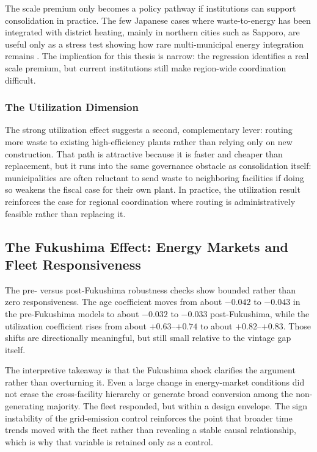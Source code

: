 \documentclass[12pt,a4paper]{article}
\begin{document}
The scale premium only becomes a policy pathway if institutions can support consolidation in practice. The few Japanese cases where waste-to-energy has been integrated with district heating, mainly in northern cities such as Sapporo, are useful only as a stress test showing how rare multi-municipal energy integration remains \citep{TabataTsai2016}. The implication for this thesis is narrow: the regression identifies a real scale premium, but current institutions still make region-wide coordination difficult.

\subsubsection{The Utilization Dimension}

The strong utilization effect suggests a second, complementary lever: routing more waste to existing high-efficiency plants rather than relying only on new construction. That path is attractive because it is faster and cheaper than replacement, but it runs into the same governance obstacle as consolidation itself: municipalities are often reluctant to send waste to neighboring facilities if doing so weakens the fiscal case for their own plant. In practice, the utilization result reinforces the case for regional coordination where routing is administratively feasible rather than replacing it.

\subsection{The Fukushima Effect: Energy Markets and Fleet Responsiveness}

The pre- versus post-Fukushima robustness checks show bounded rather than zero responsiveness. The age coefficient moves from about $-0.042$ to $-0.043$ in the pre-Fukushima models to about $-0.032$ to $-0.033$ post-Fukushima, while the utilization coefficient rises from about $+0.63$--$+0.74$ to about $+0.82$--$+0.83$. Those shifts are directionally meaningful, but still small relative to the vintage gap itself.

The interpretive takeaway is that the Fukushima shock clarifies the argument rather than overturning it. Even a large change in energy-market conditions did not erase the cross-facility hierarchy or generate broad conversion among the non-generating majority. The fleet responded, but within a design envelope. The sign instability of the grid-emission control reinforces the point that broader time trends moved with the fleet rather than revealing a stable causal relationship, which is why that variable is retained only as a control.
\end{document}
